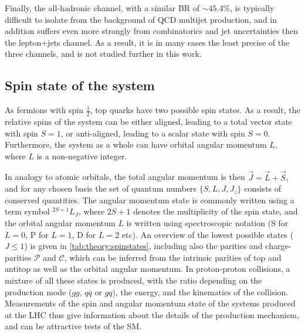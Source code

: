 Finally, the all-hadronic channel, with a similar BR of $\sim45.4\%$, is typically difficult to isolate from the background of QCD multijet production, and in addition suffers even more strongly from combinatorics and jet uncertainties then the lepton+jets channel. As a result, it is in many cases the least precise of the three channels, and is not studied further in this work.

\subsection{Spin state of the \ttbartitle system}
\label{sec:theory:ttbarspin}

As fermions with spin $\frac{1}{2}$, top quarks have two possible spin states. As a result, the relative spins of the \ttbar system can be either aligned, leading to a total vector state with spin $S = 1$, or anti-aligned, leading to a scalar state with spin $S = 0$. Furthermore, the \ttbar system as a whole can have orbital angular momentum $L$, where $L$ is a non-negative integer. 

In analogy to atomic orbitals, the total angular momentum is then $\vec{J} = \vec{L}+\vec{S}$, and for any chosen basis the set of quantum numbers $\{S,L,J,J_z\}$ consists of conserved quantities. The angular momentum state is commonly written using a term symbol ${}^{2S+1}L_{J}$, where $2S+1$ denotes the multiplicity of the spin state, and the orbital angular momentum $L$ is written using spectroscopic notation (S for $L=0$, P for $L=1$, D for $L=2$ etc). An overview of the lowest possible states ($J \leq 1$) is given in \cref{tab:theory:spinstates}, including also the parities and charge-parities $\mathcal{P}$ and $\mathcal{C}$, which can be inferred from the intrinsic parities of top and antitop as well as the orbital angular momentum. In proton-proton collisions, a mixture of all these states is produced, with the ratio depending on the production mode ($gg$, $q\bar{q}$ or $gq$), the energy, and the kinematics of the collision. Measurements of the spin and angular momentum state of the \ttbar systems produced at the LHC thus give information about the details of the production mechanism, and can be attractive tests of the SM.

